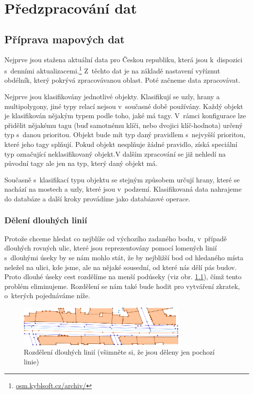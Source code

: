 \chapter{Předzpracování dat}


\section{Příprava mapových dat}
Nejprve jsou stažena aktuální data pro Českou republiku, která jsou k~dispozici
s~denními aktualizacemi.\footnote{\url{osm.kyblsoft.cz/archiv/}} Z~těchto dat je
na základě nastavení vyříznut obdélník, který pokrývá zpracovávanou oblast. Poté
začneme data zpracovávat.

Nejprve jsou klasifikovány jednotlivé objekty. Klasifikují se uzly, hrany a
multipolygony, jiné typy relací nejsou v~současné době používány. Každý objekt
je klasifikován nějakým typem podle toho, jaké má tagy. V~rámci konfigurace lze
přidělit nějakému tagu (buď samotnému klíči, nebo dvojici klíč-hodnota) určený
typ s~danou prioritou. Objekt bude mít typ daný pravidlem s~nejvyšší prioritou,
které jeho tagy splňují. Pokud objekt nesplňuje žádné pravidlo, získá speciální
typ označující neklasifikovaný objekt.V dalším zpracování se již nehledí na
původní tagy ale jen na typ, který daný objekt má.

Současně s~klasifikací typu objektu se stejným způsobem určují hrany, které se
nachází na mostech a uzly, které jsou v~podzemí. Klasifikovaná data nahrajeme do
databáze a další kroky provádíme jako databázové operace. 

\subsection{Dělení dlouhých linií}
Protože chceme hledat co nejblíže od výchozího zadaného bodu, v~případě dlouhých
rovných ulic, které jsou reprezentovány pomocí lomených linií s~dlouhými úseky
by se nám mohlo stát, že by nejbližší bod od hledaného místa neležel na ulici,
kde jsme, ale na nějaké sousední, od které nás dělí pás budov. Proto dlouhé
úseky cest rozdělíme na menší podúseky (viz obr. \ref{fig:deleni}), čímž tento problém eliminujeme.
Rozdělení se nám také bude hodit pro vytváření zkratek, o~kterých pojednáváme
níže.

\begin{figure}
  \centering
    \includegraphics[width=0.75\textwidth]{../img/deleni.pdf}
  \caption{Rozdělení dlouhých linií (všimněte si, že jsou děleny jen pochozí
  linie)}
  \label{fig:deleni}
\end{figure}

